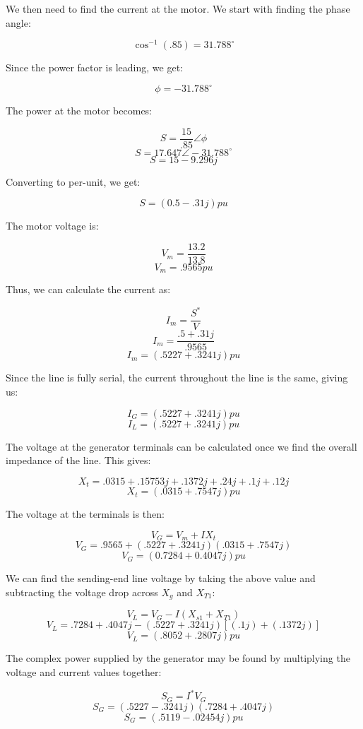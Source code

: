 \begin{enumerate}
\begin{enumerate}
        We then need to find the current at the motor. We start with finding the phase angle:

        $$\cos^{-1}(.85)=31.788^{\circ}$$

        Since the power factor is leading, we get:

        $$\phi=-31.788^{\circ}$$

        The power at the motor becomes:

        $$S=\frac{15}{.85}\angle\phi$$
        $$S=17.647\angle-31.788^{\circ}$$
        $$S=15-9.296j$$

        Converting to per-unit, we get:

        $$S=(0.5-.31j)pu$$

        The motor voltage is:

        $$V_m=\frac{13.2}{13.8}$$
        $$V_m=.9565pu$$

        Thus, we can calculate the current as:

        $$I_m=\frac{S^*}{V}$$
        $$I_m=\frac{.5+.31j}{.9565}$$
        $$\boxed{I_m=(.5227+.3241j)pu}$$

        Since the line is fully serial, the current throughout the line is the same, giving us:

        $$\boxed{I_G=(.5227+.3241j)pu}$$
        $$\boxed{I_L=(.5227+.3241j)pu}$$

        The voltage at the generator terminals can be calculated once we find the overall impedance of the line. This gives:

        $$X_t=.0315+.15753j+.1372j+.24j+.1j+.12j$$
        $$\boxed{X_t=(.0315+.7547j)pu}$$

        The voltage at the terminals is then:

        $$V_G=V_m+IX_t$$
        $$V_G=.9565+(.5227+.3241j)(.0315+.7547j)$$
        $$\boxed{V_G=(0.7284+0.4047j)pu}$$

        We can find the sending-end line voltage by taking the above value and subtracting the voltage drop across $X_g$ and $X_{T1}$:

        $$V_L=V_G-I(X_{s1}+X_{T1})$$
        $$V_L=.7284+.4047j-(.5227+.3241j)[(.1j)+(.1372j)]$$
        $$\boxed{V_L=(.8052+.2807j)pu}$$

        The complex power supplied by the generator may be found by multiplying the voltage and current values together:

        $$S_G=I^*V_G$$
        $$S_G=(.5227-.3241j)(.7284+.4047j)$$
        $$\boxed{S_G=(.5119-.02454j)pu}$$


\end{enumerate}
\end{enumerate}
